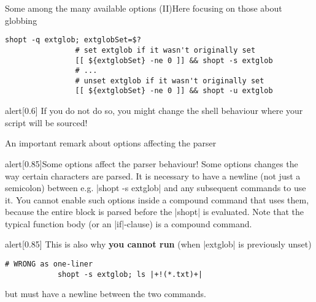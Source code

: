 \begin{frame}[fragile]{Some among the many available options (II)}{Here focusing on those about globbing}
\begin{onlyenv}
\begin{uncoverenv}
            \begin{lstlisting}[style=myBash, aboveskip=3mm, belowskip=-5mm, numbers=none]
                shopt -q extglob; extglobSet=$?
                # set extglob if it wasn't originally set
                [[ ${extglobSet} -ne 0 ]] && shopt -s extglob
                # ...
                # unset extglob if it wasn't originally set
                [[ ${extglobSet} -ne 0 ]] && shopt -u extglob
            \end{lstlisting}
            \begin{varblock}{alert}[0.6\textwidth]{}
                \alert{If you do not do so, you might change the shell behaviour where your script will be sourced!}
            \end{varblock}
        \end{uncoverenv}
    \end{onlyenv}
\end{frame}
\begin{frame}[fragile]{An important remark about options affecting the parser}
    \begin{varblock*}{alert}[0.85\textwidth]{\large Some options affect the parser behaviour!}
        Some options changes the way certain characters are parsed.
        It is necessary to have a newline (not just a semicolon) between e.g. \bash|shopt -s extglob| and any subsequent commands to use it.
        \alert{You cannot enable such options inside a compound command that uses them}, because the entire block is parsed before the \bash|shopt| is evaluated.
        Note that the typical function body (or an \bash|if|-clause) is a compound command.
    \end{varblock*}
    \vspace{-2mm}
    \begin{varblock*}{alert}[0.85\textwidth]{}
        This is also why \alert{\textbf{you cannot run}} (when \bash|extglob| is previously unset)
        \begin{lstlisting}[style=myBash, numbers=none, belowskip=-6mm, aboveskip=2mm]
            # WRONG as one-liner
            shopt -s extglob; ls |+!(*.txt)+|
        \end{lstlisting}
        but must have a newline between the two commands.
    \end{varblock*}
    \PrepareURLsymbol[PB]
\end{frame}
